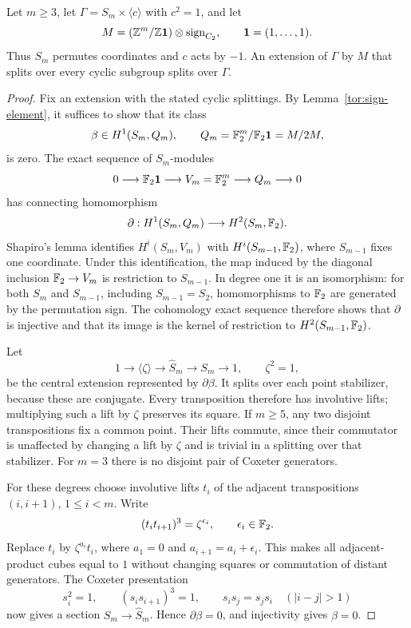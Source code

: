 \begin{lemma}\label{tor:symmetric-lattice}
Let $m\geq3$, let $\Gamma=S_m\times\langle c\rangle$ with
$c^2=1$, and let
\[
 M=(\mathbb Z^m/\mathbb Z\mathbf1)\otimes\mathrm{sign}_{C_2},
 \qquad \mathbf1=(1,\ldots,1).
\]
Thus $S_m$ permutes coordinates and $c$ acts by $-1$.
An extension of $\Gamma$ by $M$ that splits over every cyclic
subgroup splits over $\Gamma$.
\end{lemma}

\begin{proof}
Fix an extension with the stated cyclic splittings.  By
Lemma~\ref{tor:sign-element}, it suffices to show that its class
\[
          \beta\in H^1(S_m,Q_m),\qquad
          Q_m=\mathbb F_2^m/\mathbb F_2\mathbf1=M/2M,
\]
is zero.  The exact sequence of $S_m$-modules
\[
 0\longrightarrow\mathbb F_2\mathbf1\longrightarrow
 V_m=\mathbb F_2^m\longrightarrow Q_m\longrightarrow0
\]
has connecting homomorphism
\[
        \partial:H^1(S_m,Q_m)\longrightarrow H^2(S_m,\mathbb F_2).
\]
Shapiro's lemma identifies $H^i(S_m,V_m)$ with
$H^i(S_{m-1},\mathbb F_2)$, where $S_{m-1}$ fixes one coordinate.
Under this identification, the map induced by the diagonal
inclusion $\mathbb F_2\to V_m$ is restriction to $S_{m-1}$.
In degree one it is an isomorphism: for both $S_m$ and $S_{m-1}$,
including $S_{m-1}=S_2$, homomorphisms to $\mathbb F_2$ are generated
by the permutation sign.  The cohomology exact sequence therefore
shows that $\partial$ is injective and that its image is the
kernel of restriction to $H^2(S_{m-1},\mathbb F_2)$.

Let
\[
 1\longrightarrow\langle\zeta\rangle\longrightarrow
       \widehat S_m\longrightarrow S_m\longrightarrow1,
 \qquad \zeta^2=1,
\]
be the central extension represented by $\partial\beta$.
It splits over each point stabilizer, because these are conjugate.
Every transposition therefore has involutive lifts; multiplying
such a lift by $\zeta$ preserves its square.  If $m\geq5$, any
two disjoint transpositions fix a common point.  Their lifts
commute, since their commutator is unaffected by changing a lift
by $\zeta$ and is trivial in a splitting over that stabilizer.
For $m=3$ there is no disjoint pair of Coxeter generators.

For these degrees choose involutive lifts $t_i$ of the adjacent
transpositions $(i,i+1)$, $1\leq i<m$.  Write
\[
                  (t_it_{i+1})^3=\zeta^{\epsilon_i},
                  \qquad \epsilon_i\in\mathbb F_2.
\]
Replace $t_i$ by $\zeta^{a_i}t_i$, where $a_1=0$ and
$a_{i+1}=a_i+\epsilon_i$.  This makes all adjacent-product cubes
equal to $1$ without changing squares or commutation of distant
generators.  The Coxeter presentation
\[
 s_i^2=1,\qquad (s_is_{i+1})^3=1,\qquad
                   s_is_j=s_js_i\quad (|i-j|>1)
\]
now gives a section $S_m\to\widehat S_m$.  Hence
$\partial\beta=0$, and injectivity gives $\beta=0$.


\end{proof}
